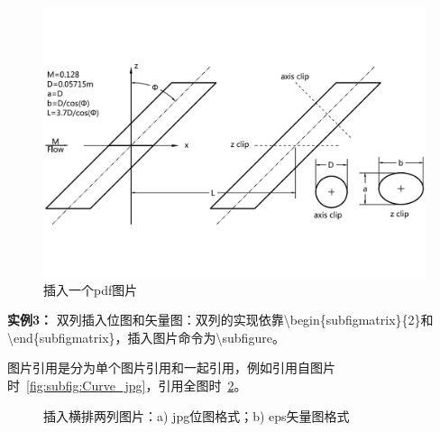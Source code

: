 \begin{figure}[htb]
\centering
   \includegraphics[width=12cm]{./img/Geom_pdf}
  \caption{插入一个pdf图片}
  \label{fig:visual}
\end{figure}

{\bf{实例3：}} 双列插入位图和矢量图：双列的实现依靠\textbackslash begin\{subfigmatrix\}\{2\}和\textbackslash end\{subfigmatrix\}，插入图片命令为\textbackslash subfigure。

图片引用是分为单个图片引用和一起引用，例如引用自图片时~\ref{fig:subfig:Curve_jpg}，引用全图时~\ref{fig:twoColns}。

\begin{figure}[htb]
\centering
 \begin{subfigmatrix}{2}                 %
 \end{subfigmatrix}
 \caption{插入横排两列图片：a) jpg位图格式；b) eps矢量图格式}
 \label{fig:twoColns}
\end{figure}

